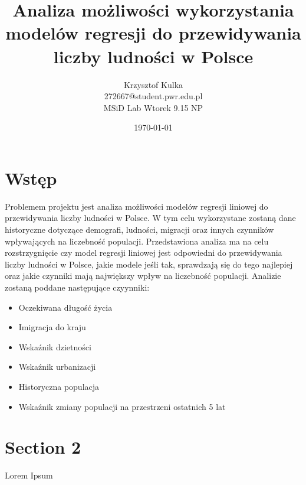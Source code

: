 \documentclass[11pt]{article}
\title{ Analiza możliwości wykorzystania modelów regresji do przewidywania liczby ludności w Polsce}
\author{ Krzysztof Kulka
        \\ 272667@student.pwr.edu.pl \\ MSiD Lab Wtorek 9.15 NP }
\date{\today}
\begin{document}
\maketitle	
\pagebreak

\tableofcontents
 \pagebreak


\section{Wstęp}

Problemem projektu jest analiza możliwości modelów regresji liniowej do przewidywania liczby ludności w Polsce. W tym celu wykorzystane zostaną dane historyczne dotyczące demografi, ludności, migracji oraz innych czynników wpływających na liczebność populacji.
Przedstawiona analiza ma na celu rozstrzygnięcie czy model regresji liniowej jest odpowiedni do przewidywania liczby ludności w Polsce, jakie modele jeśli tak, sprawdzają się do tego najlepiej oraz jakie czynniki mają największy wpływ na liczebność populacji.
Analizie zostaną poddane następujące czyynniki:
\begin{itemize}
\item Oczekiwana długość życia
\item Imigracja do kraju
\item Wskaźnik dzietności
\item Wskaźnik urbanizacji
\item Historyczna populacja
\item Wskaźnik zmiany populacji na przestrzeni ostatnich 5 lat
\end{itemize}

\pagebreak
\section{Section 2}
Lorem Ipsum \\

\end{document}
